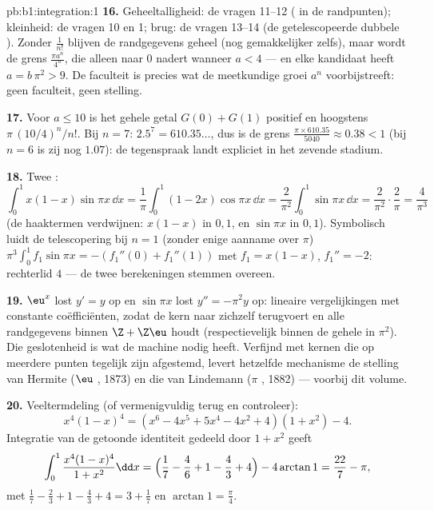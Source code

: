 \begin{solution}{pb:b1:integration:1}
\textbf{16.} Geheeltalligheid: de vragen 11--12 ( in de
randpunten); kleinheid: de vragen 10 en 1; brug: de vragen
13--14 (de getelescopeerde dubbele ). Zonder
$\frac{1}{n!}$ blijven de randgegevens geheel (nog gemakkelijker
zelfs), maar wordt de grens $\frac{\pi a^n}{4^n}$, die alleen
naar $0$ nadert wanneer $a < 4$ --- en elke kandidaat heeft $a =
b\,\pi^2 > 9$. De faculteit is precies wat de meetkundige groei
$a^n$ voorbijstreeft: geen faculteit, geen stelling.

\textbf{17.} Voor $a \leq 10$ is het gehele getal $G(0) + G(1)$
positief en hoogstens $\pi\,(10/4)^n/n!$. Bij $n = 7$: $2.5^7 =
610.35\dots$, dus is de grens $\frac{\pi \times 610.35}{5040}
\approx 0.38 < 1$ (bij $n = 6$ is zij nog $1.07$): de
tegenspraak landt expliciet in het zevende stadium.

\textbf{18.} Twee :
\[
\int_0^1 x(1-x)\sin\pi x\,\dd x
= \frac1\pi\int_0^1 (1 - 2x)\cos\pi x\,\dd x
= \frac{2}{\pi^2}\int_0^1 \sin\pi x\,\dd x
= \frac{2}{\pi^2}\cdot\frac{2}{\pi} = \frac{4}{\pi^3}
\]
(de haaktermen verdwijnen: $x(1-x)$ in $0, 1$, en $\sin\pi x$ in
$0, 1$). Symbolisch luidt de telescopering bij $n = 1$ (zonder
enige aanname over $\pi$) $\pi^3\int_0^1 f_1\sin\pi x =
-(f_1''(0) + f_1''(1))$ met $f_1 = x(1 - x)$, $f_1'' = -2$:
rechterlid $4$ --- de twee berekeningen stemmen overeen.

\textbf{19.} $\eu^x$ lost $y' = y$ op en $\sin\pi x$ lost $y'' =
-\pi^2 y$ op: lineaire vergelijkingen met constante
coëfficiënten, zodat  de kern naar zichzelf
terugvoert en alle randgegevens binnen $\Z + \Z\eu$ houdt (respec\-tievelijk
binnen de gehele  in $\pi^2$). Die
geslotenheid is wat de machine nodig heeft. Verfijnd met kernen
die op meerdere punten tegelijk zijn afgestemd, levert hetzelfde
mechanisme de stelling van Hermite ($\eu$ , 1873) en
die van Lindemann ($\pi$ , 1882) --- voorbij dit
volume.

\textbf{20.} Veeltermdeling (of vermenigvuldig terug en
controleer):
\[
x^4(1-x)^4 = (x^6 - 4x^5 + 5x^4 - 4x^2 + 4)(1 + x^2) - 4 .
\]
Integratie van de getoonde identiteit gedeeld door $1 + x^2$
geeft
\[
\int_0^1 \frac{x^4(1-x)^4}{1+x^2}\dd x
= \Bigl(\frac17 - \frac46 + 1 - \frac43 + 4\Bigr)
- 4\arctan 1
= \frac{22}{7} - \pi ,
\]
met $\frac17 - \frac23 + 1 - \frac43 + 4 = 3 + \frac17$ en
$\arctan 1 = \frac\pi4$.


\end{solution}

